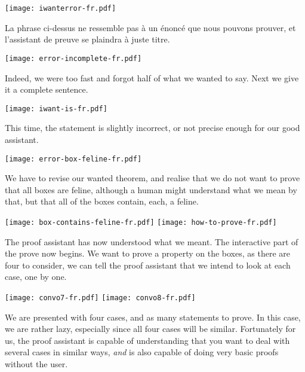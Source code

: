 \begin{center}
  \texttt{[image: iwanterror-fr.pdf]}
\end{center}

La phrase ci-dessus ne ressemble pas à un énoncé que nous pouvons prouver, et
l'assistant de preuve se plaindra à juste titre.

\begin{center}
  \texttt{[image: error-incomplete-fr.pdf]}
\end{center}

Indeed, we were too fast and forgot half of what we wanted to say. Next we give
it a complete sentence.

\begin{center}
  \texttt{[image: iwant-is-fr.pdf]}
\end{center}

This time, the statement is slightly incorrect, or not precise enough for our
good assistant.

\begin{center}
  \texttt{[image: error-box-feline-fr.pdf]}
\end{center}

We have to revise our wanted theorem, and realise that we do not want to prove
that all boxes are feline, although a human might understand what we mean by
that, but that all of the boxes contain, each, a feline.

\begin{center}
  \texttt{[image: box-contains-feline-fr.pdf]}
  \texttt{[image: how-to-prove-fr.pdf]}
\end{center}

The proof assistant has now understood what we meant. The interactive part of
the prove now begins. We want to prove a property on the boxes, as there are
four to consider, we can tell the proof assistant that we intend to look at each
case, one by one.

\begin{center}
  \texttt{[image: convo7-fr.pdf]}
  \texttt{[image: convo8-fr.pdf]}
\end{center}

We are presented with four cases, and as many statements to prove.
In this case, we are rather lazy, especially since all four cases will be
similar. Fortunately for us, the proof assistant is capable of understanding
that you want to deal with several cases in similar ways, \emph{and} is also
capable of doing very basic proofs without the user.

